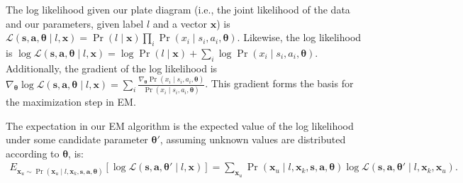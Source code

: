 The log likelihood given our plate diagram (i.e., the joint likelihood
of the data and our parameters, given label $l$ and a vector $\bm{x}$)
is
%
%
$\mathcal{L}(\bm{s}, \bm{a}, \bm{\theta} \mid l, \bm{x}) 
= \Pr(l \mid \bm{x}) \prod_i \Pr(x_i \mid s_i, a_i, \bm{\theta})$.
%
\noindent
Likewise, the log likelihood is
%
$\log\mathcal{L}(\bm{s}, \bm{a}, \bm{\theta} \mid l, \bm{x}) = 
\log \Pr(l \mid \bm{x}) + \sum_i \log \Pr(x_i \mid s_i, a_i, \bm{\theta})$.
%
\noindent
Additionally, the gradient of the log likelihood is
%
$\nabla_{\bm{\theta}} \log\mathcal{L}(\bm{s}, \bm{a}, \bm{\theta} \mid l, \bm{x}) = \sum_i  \frac{\nabla_{\bm{\theta}} \Pr(x_i \mid s_i, a_i, \bm{\theta})}{\Pr(x_i \mid s_i, a_i, \bm{\theta})}$.
%
This gradient forms the basis for the maximization step in EM.

The expectation in our EM algorithm is the expected value of the log
likelihood under some candidate parameter $\bm{\theta}'$, assuming
unknown values are distributed according to $\bm{\theta}$, is:
%
\begin{align*}
E_{\bm{x}_u \sim \Pr(\bm{x}_u \mid l, \bm{x}_k, \bm{s}, \bm{a}, \bm{\theta})} \left[ \log\mathcal{L}(\bm{s}, \bm{a}, \bm{\theta}' \mid l, \bm{x}) \right]
= \sum_{\bm{x}_u} \Pr(\bm{x}_u \mid l, \bm{x}_k, \bm{s}, \bm{a}, \bm{\theta}) \log\mathcal{L}(\bm{s}, \bm{a}, \bm{\theta}' \mid l, \bm{x}_k, \bm{x}_u).
\end{align*}

